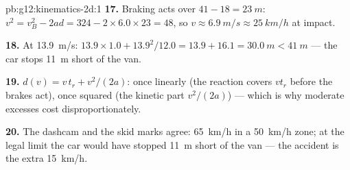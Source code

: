 \begin{solution}{pb:g12:kinematics-2d:1}
\textbf{17.} Braking acts over $41 - 18 = \qty{23}{m}$:
$v^2 = v_B^2 - 2ad = 324 - 2 \times 6.0 \times 23 = 48$, so
$v \approx \qty{6.9}{m/s} \approx \qty{25}{km/h}$ at impact.

\textbf{18.} At \qty{13.9}{m/s}: $13.9 \times 1.0 + 13.9^2/12.0 =
13.9 + 16.1 = \qty{30.0}{m} < \qty{41}{m}$ --- the car stops
\qty{11}{m} short of the van.

\textbf{19.} $d(v) = v\,t_r + v^2/(2a)$: once linearly (the reaction
covers $v t_r$ before the brakes act), once squared (the kinetic
part $v^2/(2a)$) --- which is why moderate excesses cost
disproportionately.

\textbf{20.} The dashcam and the skid marks agree: \qty{65}{km/h} in
a \qty{50}{km/h} zone; at the legal limit the car would have stopped
\qty{11}{m} short of the van --- the accident is the extra
\qty{15}{km/h}.
\end{solution}
